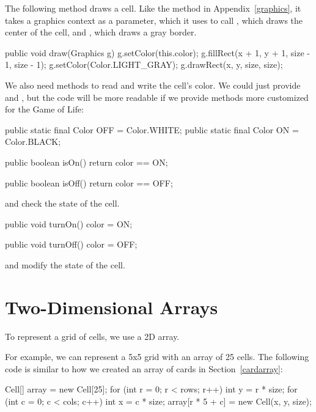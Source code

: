 The following method draws a cell.
Like the  method in Appendix~\ref{graphics},
it takes a graphics context as a parameter, which it uses to
call , which draws the center of the cell, and , which draws a gray border.

\begin{code}
public void draw(Graphics g) {
    g.setColor(this.color);
    g.fillRect(x + 1, y + 1, size - 1, size - 1);
    g.setColor(Color.LIGHT_GRAY);
    g.drawRect(x, y, size, size);
}
\end{code}

We also need methods to read and write the cell's color.
We could just provide  and ,
but the code will be more readable if we provide methods more customized for the Game of Life:

\begin{code}
public static final Color OFF = Color.WHITE;
public static final Color ON = Color.BLACK;

public boolean isOn() {
    return color == ON;
}

public boolean isOff() {
    return color == OFF;
}
\end{code}

 and  check the state of the cell.

\begin{code}
public void turnOn() {
    color = ON;
}

public void turnOff() {
    color = OFF;
}
\end{code}

 and  modify the state of the cell.


\section{Two-Dimensional Arrays}

To represent a grid of cells, we use a 2D array.



For example, we can represent a 5x5 grid with an array of 25 cells.
The following code is similar to how we created an array of cards in Section~\ref{cardarray}:

\begin{code}
Cell[] array = new Cell[25];
for (int r = 0; r < rows; r++) {
    int y = r * size;
    for (int c = 0; c < cols; c++) {
        int x = c * size;
        array[r * 5 + c] = new Cell(x, y, size);
    }
}
\end{code}

